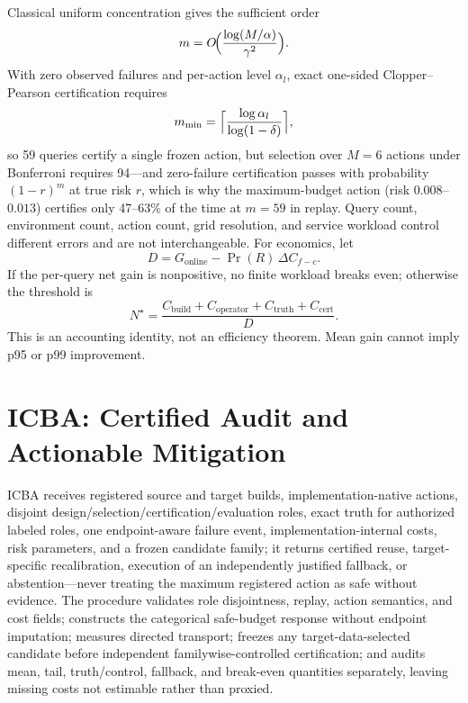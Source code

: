 \documentclass{article}
\renewcommand{\Pr}{\mathop{\mathrm{Pr}}}   %
\begin{document}
Classical uniform concentration gives the sufficient order
\begin{equation}
m=O\!\Bigl(\frac{\log(M/\alpha)}{\gamma^{2}}\Bigr).
\label{eq:mscale}
\end{equation}
With zero observed failures and per-action level $\alpha_l$, exact one-sided Clopper--Pearson certification
requires
\begin{equation}
m_{\min}=\Bigl\lceil\frac{\log\alpha_{l}}{\log(1-\delta)}\Bigr\rceil,
\label{eq:mmin}
\end{equation}
so 59 queries certify a single frozen action, but selection over $M=6$ actions under Bonferroni requires
94---and zero-failure certification passes with probability $(1-r)^m$ at true risk $r$, which is why the
maximum-budget action (risk $0.008$--$0.013$) certifies only 47--63\% of the time at $m=59$ in replay.
Query count, environment count, action count, grid resolution, and service workload control different
errors and are not interchangeable. For economics, let
\begin{equation}
D=G_{\mathrm{online}}-\Pr(R)\,\Delta C_{f\!-\!c}.
\label{eq:dgain}
\end{equation}
If the per-query net gain is nonpositive, no finite workload breaks even; otherwise the threshold is
\begin{equation}
N^{\star}=\frac{C_{\mathrm{build}}+C_{\mathrm{operator}}+C_{\mathrm{truth}}+C_{\mathrm{cert}}}{D}.
\label{eq:breakeven}
\end{equation}
This is an accounting identity, not an efficiency theorem. Mean gain cannot imply p95 or p99 improvement.

\section{ICBA: Certified Audit and Actionable Mitigation}
\label{sec:icba}

ICBA receives registered source and target builds, implementation-native actions, disjoint
design/selection/certification/evaluation roles, exact truth for authorized labeled roles, one
endpoint-aware failure event, implementation-internal costs, risk parameters, and a frozen candidate
family; it returns certified reuse, target-specific recalibration, execution of an independently justified
fallback, or abstention---never treating the maximum registered action as safe without evidence. The
procedure validates role disjointness, replay, action semantics, and cost fields; constructs the
categorical safe-budget response without endpoint imputation; measures directed transport; freezes any
target-data-selected candidate before independent familywise-controlled certification; and audits mean,
tail, truth/control, fallback, and break-even quantities separately, leaving missing costs not estimable
rather than proxied.
\end{document}

